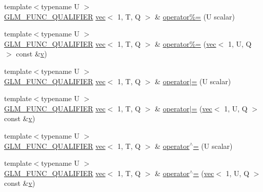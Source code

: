 \begin{DoxyCompactItemize}
\item 
{\footnotesize template$<$typename U $>$ }\\\mbox{\hyperlink{setup_8hpp_a33fdea6f91c5f834105f7415e2a64407}{G\+L\+M\+\_\+\+F\+U\+N\+C\+\_\+\+Q\+U\+A\+L\+I\+F\+I\+ER}} \mbox{\hyperlink{structglm_1_1vec}{vec}}$<$ 1, T, Q $>$ \& \mbox{\hyperlink{structglm_1_1vec_3_011_00_01_t_00_01_q_01_4_a41cf765caed386c25ead2b2420b61039}{operator\%=}} (U scalar)
\item 
{\footnotesize template$<$typename U $>$ }\\\mbox{\hyperlink{setup_8hpp_a33fdea6f91c5f834105f7415e2a64407}{G\+L\+M\+\_\+\+F\+U\+N\+C\+\_\+\+Q\+U\+A\+L\+I\+F\+I\+ER}} \mbox{\hyperlink{structglm_1_1vec}{vec}}$<$ 1, T, Q $>$ \& \mbox{\hyperlink{structglm_1_1vec_3_011_00_01_t_00_01_q_01_4_a78d638cf272b3293078df0aab1aedb67}{operator\%=}} (\mbox{\hyperlink{structglm_1_1vec}{vec}}$<$ 1, U, Q $>$ const \&\mbox{\hyperlink{_s_d_l__opengl_8h_a10a82eabcb59d2fcd74acee063775f90}{v}})
\item 
{\footnotesize template$<$typename U $>$ }\\\mbox{\hyperlink{setup_8hpp_a33fdea6f91c5f834105f7415e2a64407}{G\+L\+M\+\_\+\+F\+U\+N\+C\+\_\+\+Q\+U\+A\+L\+I\+F\+I\+ER}} \mbox{\hyperlink{structglm_1_1vec}{vec}}$<$ 1, T, Q $>$ \& \mbox{\hyperlink{structglm_1_1vec_3_011_00_01_t_00_01_q_01_4_a60499c612492b52060a0e9e6a5890fc7}{operator$\vert$=}} (U scalar)
\item 
{\footnotesize template$<$typename U $>$ }\\\mbox{\hyperlink{setup_8hpp_a33fdea6f91c5f834105f7415e2a64407}{G\+L\+M\+\_\+\+F\+U\+N\+C\+\_\+\+Q\+U\+A\+L\+I\+F\+I\+ER}} \mbox{\hyperlink{structglm_1_1vec}{vec}}$<$ 1, T, Q $>$ \& \mbox{\hyperlink{structglm_1_1vec_3_011_00_01_t_00_01_q_01_4_ae04eabedc72a049a89d3c54b65a2b99a}{operator$\vert$=}} (\mbox{\hyperlink{structglm_1_1vec}{vec}}$<$ 1, U, Q $>$ const \&\mbox{\hyperlink{_s_d_l__opengl_8h_a10a82eabcb59d2fcd74acee063775f90}{v}})
\item 
{\footnotesize template$<$typename U $>$ }\\\mbox{\hyperlink{setup_8hpp_a33fdea6f91c5f834105f7415e2a64407}{G\+L\+M\+\_\+\+F\+U\+N\+C\+\_\+\+Q\+U\+A\+L\+I\+F\+I\+ER}} \mbox{\hyperlink{structglm_1_1vec}{vec}}$<$ 1, T, Q $>$ \& \mbox{\hyperlink{structglm_1_1vec_3_011_00_01_t_00_01_q_01_4_a3df3927c90bdfb42be0084efc352f15d}{operator$^\wedge$=}} (U scalar)
\item 
{\footnotesize template$<$typename U $>$ }\\\mbox{\hyperlink{setup_8hpp_a33fdea6f91c5f834105f7415e2a64407}{G\+L\+M\+\_\+\+F\+U\+N\+C\+\_\+\+Q\+U\+A\+L\+I\+F\+I\+ER}} \mbox{\hyperlink{structglm_1_1vec}{vec}}$<$ 1, T, Q $>$ \& \mbox{\hyperlink{structglm_1_1vec_3_011_00_01_t_00_01_q_01_4_ae225253572ebcba4fe52175e1b926591}{operator$^\wedge$=}} (\mbox{\hyperlink{structglm_1_1vec}{vec}}$<$ 1, U, Q $>$ const \&\mbox{\hyperlink{_s_d_l__opengl_8h_a10a82eabcb59d2fcd74acee063775f90}{v}})

\end{DoxyCompactItemize}
